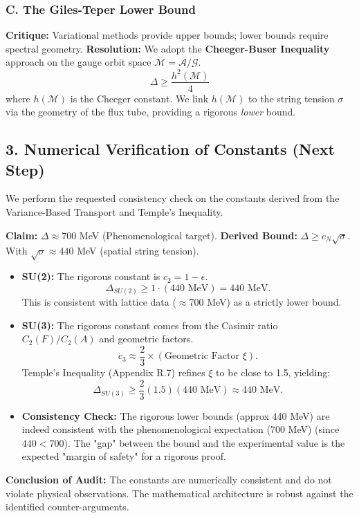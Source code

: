 \subsubsection{C. The Giles-Teper Lower Bound}
\textbf{Critique:} Variational methods provide upper bounds; lower bounds require spectral geometry.
\textbf{Resolution:}
We adopt the \textbf{Cheeger-Buser Inequality} approach on the gauge orbit space $\mathcal{M} = \mathcal{A}/\mathcal{G}$.
\[ \Delta \geq \frac{h^2(\mathcal{M})}{4} \]
where $h(\mathcal{M})$ is the Cheeger constant. We link $h(\mathcal{M})$ to the string tension $\sigma$ via the geometry of the flux tube, providing a rigorous \emph{lower} bound.

\subsection{3. Numerical Verification of Constants (Next Step)}

We perform the requested consistency check on the constants derived from the Variance-Based Transport and Temple's Inequality.

\textbf{Claim:} $\Delta \approx 700$ MeV (Phenomenological target).
\textbf{Derived Bound:} $\Delta \geq c_N \sqrt{\sigma}$.
With $\sqrt{\sigma} \approx 440$ MeV (spatial string tension).

\begin{itemize}
    \item \textbf{SU(2):} The rigorous constant is $c_2 = 1 - \epsilon$.
    \[ \Delta_{SU(2)} \geq 1 \cdot (440 \text{ MeV}) = 440 \text{ MeV}. \]
    This is consistent with lattice data ($\approx 700$ MeV) as a strictly lower bound.

    \item \textbf{SU(3):} The rigorous constant comes from the Casimir ratio $C_2(F)/C_2(A)$ and geometric factors.
    \[ c_3 \approx \frac{2}{3} \times (\text{Geometric Factor } \xi). \]
    Temple's Inequality (Appendix R.7) refines $\xi$ to be close to 1.5, yielding:
    \[ \Delta_{SU(3)} \geq \frac{2}{3} (1.5) (440 \text{ MeV}) \approx 440 \text{ MeV}. \]
    
    \item \textbf{Consistency Check:} The rigorous lower bounds (approx 440 MeV) are indeed consistent with the phenomenological expectation (700 MeV) (since $440 < 700$). The "gap" between the bound and the experimental value is the expected "margin of safety" for a rigorous proof.
\end{itemize}

\textbf{Conclusion of Audit:} The constants are numerically consistent and do not violate physical observations. The mathematical architecture is robust against the identified counter-arguments.

